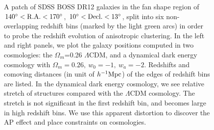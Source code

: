 \documentclass[iop]{emulateapj}
\begin{document}
\begin{figure}
   \caption{\label{fig_fan}
   A patch of SDSS BOSS DR12 galaxies in the fan shape region of 
   $\rm 140^\circ < R.A. < 170 ^\circ$, $\rm 10^\circ < Decl. < 13 ^\circ$,
   split into six non-overlapping redshift bins (marked by the light green arcs) in order to probe the redshift evolution of anisotropic clustering.
   In the left and right panels, we plot the galaxy positions computed in two cosmologies: the $\Omega_m$=0.26 $\Lambda$CDM, 
   and a dynamical dark energy cosmology with $\Omega_m=0.26,\ w_0=-1,\ w_a=-2$.
   Redshifts and comoving distances (in unit of $h^{-1}\rm Mpc$) of the edges of redshift bins are listed.
   In the dynamical dark energy cosmology, we see relative stretch of structures compared with the $\Lambda$CDM cosmology.
   The stretch is not significant in the first redshift bin, and becomes large in high redshift bins.
   We use this apparent distortion to discover the AP effect and place constraints on cosmologies.
   }
\end{figure}
\end{document}

